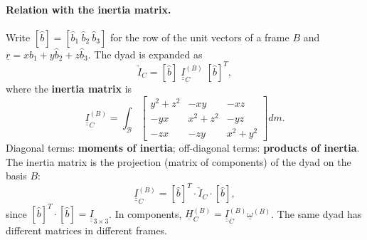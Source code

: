 \paragraph{Relation with the inertia matrix.} Write $[\hat b]=[\hat b_1\ \hat b_2\ \hat b_3]$ for the row of the unit vectors of a frame $B$
and $\underline r=x\hat b_1+y\hat b_2+z\hat b_3$. The dyad is expanded as
\begin{equation}
\underrightarrow{I}_C=[\hat b]\;\underline{\underline I}_C^{(B)}\;[\hat b]^T,
\end{equation}
where the \textbf{inertia matrix} is
\begin{equation}
\underline{\underline{I}}_{C}^{(B)}=\int_{\mathcal{B}}\begin{bmatrix}y^{2}+z^{2}&-xy&-xz\\-yx&x^{2}+z^{2}&-yz\\-zx&-zy&x^{2}+y^{2}\end{bmatrix}dm .
\end{equation}
Diagonal terms: \textbf{moments of inertia}; off-diagonal terms: \textbf{products of inertia}.
The inertia matrix is the projection (matrix of components) of the dyad on the basis $B$:
\begin{equation}
\underline{\underline I}_C^{(B)}=[\hat b]^T\cdot\underrightarrow I_C\cdot[\hat b],
\end{equation}
since $[\hat b]^T\cdot[\hat b]=\underline{\underline I}_{3\times3}$. In components, $\underline H_C^{(B)}=\underline{\underline I}_C^{(B)}\underline\omega^{(B)}$.
The same dyad has different matrices in different frames.

